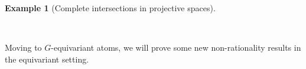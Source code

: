 \documentclass[12pt,a4paper]{amsart}
\theoremstyle{definition}
\newtheorem{example}[theorem]{Example}
\theoremstyle{remark}
\newcommand{\rH}{\mathrm{H}}
\begin{document}
\begin{example}[Complete intersections in projective spaces]
    \end{example}

\ 


Moving to $G$-equivariant atoms, we will prove some new non-rationality results in the equivariant setting. 
\end{document}
